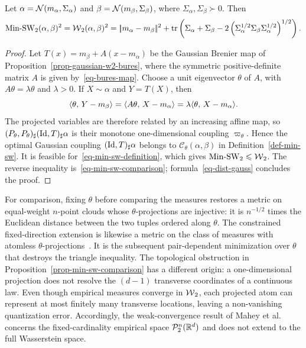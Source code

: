 \begin{prop}\label{prop-min-sw-gaussians}
	Let $\alpha=\mathcal{N}(m_\alpha,\Sigma_\alpha)$ and $\beta=\mathcal{N}(m_\beta,\Sigma_\beta)$, where $\Sigma_\alpha,\Sigma_\beta\succ0$. Then
	\begin{equation}\label{eq-min-sw-gaussians}
		\operatorname{Min\text{-}SW}_2(\alpha,\beta)^2
		=
		\operatorname{\mathcal{W}}_2(\alpha,\beta)^2
		=
		|\!| m_\alpha-m_\beta |\!|^2
		+
		\operatorname{tr}\left( 
			\Sigma_\alpha+\Sigma_\beta
			-2\left( \Sigma_\alpha^{1/2}\Sigma_\beta\Sigma_\alpha^{1/2} \right)^{1/2}
		 \right).
	\end{equation}
\end{prop}
\begin{proof}
	Let $T(x)=m_\beta+A(x-m_\alpha)$ be the Gaussian Brenier map of Proposition~\ref{prop-gaussian-w2-bures}, where the symmetric positive-definite matrix $A$ is given by~\eqref{eq-bures-map}. Choose a unit eigenvector $\theta$ of $A$, with $A\theta=\lambda\theta$ and $\lambda>0$. If $X\sim\alpha$ and $Y=T(X)$, then
	\[
		\langle \theta,\,Y-m_\beta\rangle
		=
		\langle A\theta,\,X-m_\alpha\rangle
		=
		\lambda\langle \theta,\,X-m_\alpha\rangle.
	\]
	The projected variables are therefore related by an increasing affine map, so $(P_\theta,P_\theta)_\sharp(\mathrm{Id},T)_\sharp\alpha$ is their monotone one-dimensional coupling $\varpi_\theta$. Hence the optimal Gaussian coupling $(\mathrm{Id},T)_\sharp\alpha$ belongs to $\mathcal C_\theta(\alpha,\beta)$ in Definition~\ref{def-min-sw}. It is feasible for~\eqref{eq-min-sw-definition}, which gives $\operatorname{Min\text{-}SW}_2\leqslant\operatorname{\mathcal{W}}_2$. The reverse inequality is~\eqref{eq-min-sw-comparison}; formula~\eqref{eq-dist-gauss} concludes the proof.
\end{proof}

For comparison, fixing $\theta$ before comparing the measures restores a metric on equal-weight $n$-point clouds whose $\theta$-projections are injective: it is $n^{-1/2}$ times the Euclidean distance between the two tuples ordered along $\theta$. The constrained fixed-direction extension is likewise a metric on the class of measures with atomless $\theta$-projections~\cite{TanguyChapelDelon2025SlicedTransportPlans}. It is the subsequent pair-dependent minimization over $\theta$ that destroys the triangle inequality. The topological obstruction in Proposition~\ref{prop-min-sw-comparison} has a different origin: a one-dimensional projection does not resolve the $(d-1)$ transverse coordinates of a continuous law. Even though empirical measures converge in $\operatorname{\mathcal{W}}_2$, each projected atom can represent at most finitely many transverse locations, leaving a non-vanishing quantization error. Accordingly, the weak-convergence result of Mahey et al.~\cite{MaheyChapelGassoBonetCourty2023MinSW} concerns the fixed-cardinality empirical space $\mathcal{P}_2^n(\mathbb{R}^d)$ and does not extend to the full Wasserstein space.

